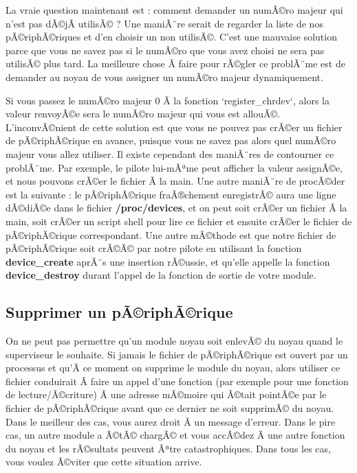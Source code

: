 \documentclass[11pt]{article}
\begin{document}
La vraie question maintenant est : comment demander un numÃ©ro majeur qui n'est pas dÃ©jÃ  utilisÃ© ? Une maniÃ¨re serait de regarder la liste de nos pÃ©riphÃ©riques et d'en choisir un non utilisÃ©. C'est une mauvaise solution parce que vous ne savez pas si le numÃ©ro que vous avez choisi ne sera pas utilisÃ© plus tard. La meilleure chose Ã  faire pour rÃ©gler ce problÃ¨me est de demander au noyau de vous assigner un numÃ©ro majeur dynamiquement.

Si vous passez le numÃ©ro majeur 0 Ã  la fonction `register\_chrdev`, alors la valeur renvoyÃ©e sera le numÃ©ro majeur qui vous est allouÃ©. L'inconvÃ©nient de cette solution est que vous ne pouvez pas crÃ©er un fichier de pÃ©riphÃ©rique en avance, puisque vous ne savez pas alors quel numÃ©ro majeur vous allez utiliser. Il existe cependant des maniÃ¨res de contourner ce problÃ¨me. Par exemple, le pilote lui-mÃªme peut afficher la valeur assignÃ©e, et nous pouvons crÃ©er le fichier Ã  la main. Une autre maniÃ¨re de procÃ©der est la suivante : le pÃ©riphÃ©rique fraÃ®chement enregistrÃ© aura une ligne dÃ©diÃ©e dans le fichier \textbf{/proc/devices}, et on peut soit crÃ©er un fichier Ã  la main, soit crÃ©er un script shell pour lire ce fichier et ensuite crÃ©er le fichier de pÃ©riphÃ©rique correspondant. Une autre mÃ©thode est que notre fichier de pÃ©riphÃ©rique soit crÃ©Ã© par notre pilote en utilisant la fonction \textbf{device\_create} aprÃ¨s une insertion rÃ©ussie, et qu'elle appelle la fonction \textbf{device\_destroy}  durant l'appel de la fonction de sortie de votre module.

\subsection*{Supprimer un pÃ©riphÃ©rique}
\label{sec-6-4}

On ne peut pas permettre qu'un module noyau soit enlevÃ© du noyau quand le superviseur le souhaite. Si jamais le fichier de pÃ©riphÃ©rique est ouvert par un processus et qu'Ã  ce moment on supprime le module du noyau, alors utiliser ce fichier conduirait Ã  faire un appel d'une fonction (par exemple pour une fonction de lecture/Ã©criture) Ã  une adresse mÃ©moire qui Ã©tait pointÃ©e par le fichier de pÃ©riphÃ©rique avant que ce dernier ne soit supprimÃ© du noyau. Dans le meilleur des cas, vous aurez droit Ã  un message d'erreur. Dans le pire cas, un autre module a Ã©tÃ© chargÃ© et vous accÃ©dez Ã  une autre fonction du noyau et les rÃ©sultats peuvent Ãªtre catastrophiques. Dans tous les cas, vous voulez Ã©viter que cette situation arrive.
\end{document}
